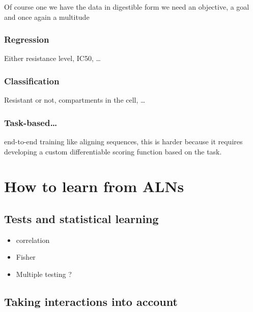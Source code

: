 \documentclass[
  11pt,
  twoside]{scrbook}
\providecommand{\tightlist}{%
  \setlength{\itemsep}{0pt}\setlength{\parskip}{0pt}}
\begin{document}
Of course one we have the data in digestible form we need an objective, a goal and once again a multitude

\hypertarget{regression}{%
\subsubsection{Regression}\label{regression}}

Either resistance level, IC50, \ldots{}

\hypertarget{classification}{%
\subsubsection{Classification}\label{classification}}

Resistant or not, compartments in the cell, \ldots{}

\hypertarget{task-based}{%
\subsubsection{Task-based\ldots{}}\label{task-based}}

end-to-end training like aligning sequences, this is harder because it requires developing a custom differentiable scoring function based on the task.

\hypertarget{how-to-learn-from-alns}{%
\section{How to learn from ALNs}\label{how-to-learn-from-alns}}

\hypertarget{tests-and-statistical-learning}{%
\subsection{Tests and statistical learning}\label{tests-and-statistical-learning}}

\begin{itemize}
\tightlist
\item
  correlation
\item
  Fisher
\item
  Multiple testing ?
\end{itemize}

\hypertarget{taking-interactions-into-account}{%
\subsection{Taking interactions into account}\label{taking-interactions-into-account}}
\end{document}
